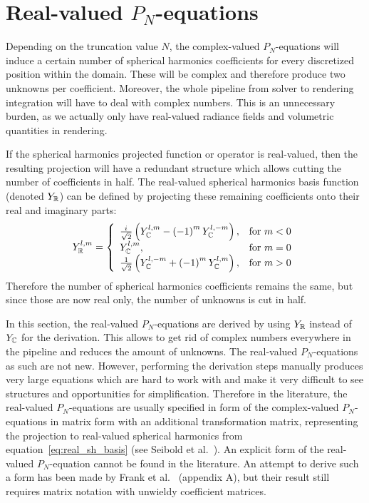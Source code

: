 \section{Real-valued $P_N$-equations}
\label{sec:pn_rvalued}

Depending on the truncation value $N$, the complex-valued $P_N$-equations will induce a certain number of spherical harmonics coefficients for every discretized position within the domain. These will be complex and therefore produce two unknowns per coefficient. Moreover, the whole pipeline from solver to rendering integration will have to deal with complex numbers. This is an unnecessary burden, as we actually only have real-valued radiance fields and volumetric quantities in rendering.

If the spherical harmonics projected function or operator is real-valued, then the resulting projection will have a redundant structure which allows cutting the number of coefficients in half. The real-valued spherical harmonics basis function (denoted $Y_{\mathbb{R}}$) can be defined by projecting these remaining coefficients onto their real and imaginary parts:
\begin{align}
\label{eq:real_sh_basis}
Y_{\mathbb{R}}^{l,m}=
\left\{
\begin{array}{lr}
\frac{{i\mkern1mu}}{\sqrt{2}}\left(Y_{\mathbb{C}}^{l,m}-\left(-1\right)^mY_{\mathbb{C}}^{l,-m}\right), & \text{for } m < 0\\
Y_{\mathbb{C}}^{l,m}, & \text{for } m = 0\\
\frac{1}{\sqrt{2}}\left(Y_{\mathbb{C}}^{l,-m}+\left(-1\right)^mY_{\mathbb{C}}^{l,m}\right), & \text{for } m > 0
\end{array}
\right.
\end{align}
Therefore the number of spherical harmonics coefficients remains the same, but since those are now real only, the number of unknowns is cut in half.

In this section, the real-valued $P_N$-equations are derived by using $Y_{\mathbb{R}}$ instead of $Y_{\mathbb{C}}$ for the derivation. This allows to get rid of complex numbers everywhere in the pipeline and reduces the amount of unknowns. The real-valued $P_N$-equations as such are not new. However, performing the derivation steps manually produces very large equations which are hard to work with and make it very difficult to see structures and opportunities for simplification. Therefore in the literature, the real-valued $P_N$-equations are usually specified in form of the complex-valued $P_N$-equations in matrix form with an additional transformation matrix, representing the projection to real-valued spherical harmonics from equation~\ref{eq:real_sh_basis} (see Seibold et al.~\cite{Seibold14}). An explicit form of the real-valued $P_N$-equation cannot be found in the literature. An attempt to derive such a form has been made by Frank et al.~\cite{Frank14} (appendix A), but their result still requires matrix notation with unwieldy coefficient matrices. 

